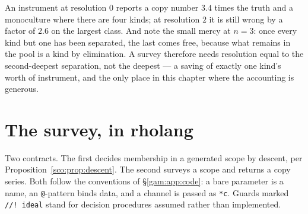 An instrument at resolution $0$ reports a copy number $3.4$ times the
truth and a monoculture where there are four kinds; at resolution $2$ it
is still wrong by a factor of $2.6$ on the largest class. And note the
small mercy at $n = 3$: once every kind but one has been separated, the
last comes free, because what remains in the pool is a kind by
elimination. A survey therefore needs resolution equal to the
second-deepest separation, not the deepest --- a saving of exactly one
kind's worth of instrument, and the only place in this chapter where the
accounting is generous.

\section{The survey, in rholang}
\label{scm:sec:code}

Two contracts. The first decides membership in a generated scope by
descent, per Proposition~\ref{sco:prop:descent}. The second surveys a
scope and returns a copy series. Both follow the conventions of
\S\ref{gam:app:code}: a bare parameter is a name, an \texttt{@}-pattern
binds data, and a channel is passed as \texttt{*c}. Guards marked
\texttt{//!\ ideal} stand for decision procedures assumed rather than
implemented.


